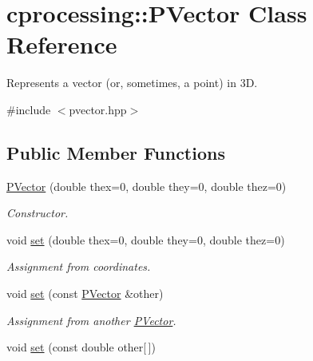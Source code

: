 \hypertarget{classcprocessing_1_1PVector}{\section{cprocessing\-:\-:\-P\-Vector \-Class \-Reference}
\label{classcprocessing_1_1PVector}
}


\-Represents a vector (or, sometimes, a point) in 3\-D.  




{\ttfamily \#include $<$pvector.\-hpp$>$}

\subsection*{\-Public \-Member \-Functions}
\begin{DoxyCompactItemize}
\item 
\hypertarget{classcprocessing_1_1PVector_a15b76552e4cd25913069e1e116fd754b}{\hyperlink{classcprocessing_1_1PVector_a15b76552e4cd25913069e1e116fd754b}{\-P\-Vector} (double thex=0, double they=0, double thez=0)}\label{classcprocessing_1_1PVector_a15b76552e4cd25913069e1e116fd754b}

\begin{DoxyCompactList}\small\item\em \-Constructor. \end{DoxyCompactList}\item 
\hypertarget{classcprocessing_1_1PVector_aac9b5ec71572685079ceadb3e3760c01}{void \hyperlink{classcprocessing_1_1PVector_aac9b5ec71572685079ceadb3e3760c01}{set} (double thex=0, double they=0, double thez=0)}\label{classcprocessing_1_1PVector_aac9b5ec71572685079ceadb3e3760c01}

\begin{DoxyCompactList}\small\item\em \-Assignment from coordinates. \end{DoxyCompactList}\item 
\hypertarget{classcprocessing_1_1PVector_ad98c990027c6e271ccb226555426c8da}{void \hyperlink{classcprocessing_1_1PVector_ad98c990027c6e271ccb226555426c8da}{set} (const \hyperlink{classcprocessing_1_1PVector}{\-P\-Vector} \&other)}\label{classcprocessing_1_1PVector_ad98c990027c6e271ccb226555426c8da}

\begin{DoxyCompactList}\small\item\em \-Assignment from another \hyperlink{classcprocessing_1_1PVector}{\-P\-Vector}. \end{DoxyCompactList}\item 
\hypertarget{classcprocessing_1_1PVector_af8b3668b7e4cc1e70c21e2ed22e5275c}{void \hyperlink{classcprocessing_1_1PVector_af8b3668b7e4cc1e70c21e2ed22e5275c}{set} (const double other\mbox{[}$\,$\mbox{]})}\label{classcprocessing_1_1PVector_af8b3668b7e4cc1e70c21e2ed22e5275c}


\end{DoxyCompactItemize}
